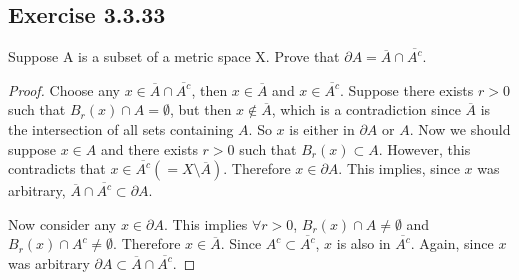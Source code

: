 \documentclass{tufte-book}
\theoremstyle{mytheoremstyle}
\theoremstyle{mylemstyle}
\theoremstyle{mydefstyle}
\begin{document}
\subsection{Exercise 3.3.33}
Suppose A is a subset of a metric space X.  Prove that $\partial A = \overline{A} \cap \overline{A^c}$.

\begin{proof}
Choose any $x \in \overline{A} \cap \overline{A^c}$, then $x \in \overline{A}$ and $x \in \overline{A^c}$. Suppose there exists $r>0$ such that $B_r(x) \cap A = \emptyset$, but then $x \notin \overline{A}$, which is a contradiction since $\overline{A}$ is the intersection of all sets containing $A$.  So $x$ is either in $\partial{A}$ or $A$.  Now we should suppose $x \in A$ and there exists $r > 0$ such that $B_r(x) \subset A$.  However, this contradicts that $x \in \overline{A^c}(= X \setminus \overline{A})$.  Therefore $x \in \partial A$.  This implies, since $x$ was arbitrary, $\overline{A} \cap \overline{A^c} \subset \partial A$.

Now consider any $x \in \partial A$. This implies $\forall r>0$, $B_r(x) \cap A \neq \emptyset$ and $B_r(x) \cap A^c \neq \emptyset$.  Therefore $x \in \overline{A}$.  Since $A^c \subset \overline{A^c}$, $x$ is also in $\overline{A^c}$.  Again, since $x$ was arbitrary $\partial A \subset \overline{A} \cap \overline{A^c}$.

\end{proof}
\end{document}

